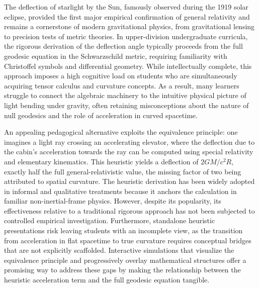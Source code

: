 \documentclass{article}
\begin{document}
The deflection of starlight by the Sun, famously observed during the 1919 solar eclipse, provided the first major empirical confirmation of general relativity and remains a cornerstone of modern gravitational physics, from gravitational lensing to precision tests of metric theories. In upper-division undergraduate curricula, the rigorous derivation of the deflection angle typically proceeds from the full geodesic equation in the Schwarzschild metric, requiring familiarity with Christoffel symbols and differential geometry. While intellectually complete, this approach imposes a high cognitive load on students who are simultaneously acquiring tensor calculus and curvature concepts. As a result, many learners struggle to connect the algebraic machinery to the intuitive physical picture of light bending under gravity, often retaining misconceptions about the nature of null geodesics and the role of acceleration in curved spacetime.

An appealing pedagogical alternative exploits the equivalence principle: one imagines a light ray crossing an accelerating elevator, where the deflection due to the cabin’s acceleration towards the ray can be computed using special relativity and elementary kinematics. This heuristic yields a deflection of $2GM/c^2R$, exactly half the full general-relativistic value, the missing factor of two being attributed to spatial curvature. The heuristic derivation has been widely adopted in informal and qualitative treatments because it anchors the calculation in familiar non-inertial-frame physics. However, despite its popularity, its effectiveness relative to a traditional rigorous approach has not been subjected to controlled empirical investigation. Furthermore, standalone heuristic presentations risk leaving students with an incomplete view, as the transition from acceleration in flat spacetime to true curvature requires conceptual bridges that are not explicitly scaffolded. Interactive simulations that visualize the equivalence principle and progressively overlay mathematical structures offer a promising way to address these gaps by making the relationship between the heuristic acceleration term and the full geodesic equation tangible.
\end{document}
